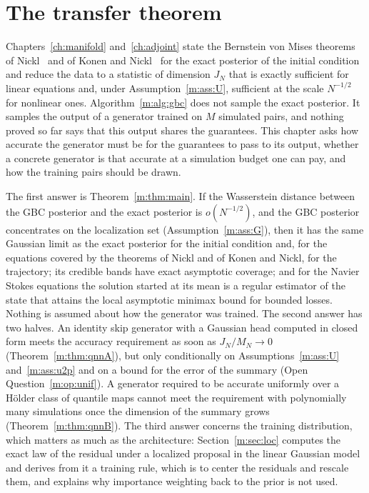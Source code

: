 \section{The transfer theorem}\label{m:sec:main}

Chapters~\ref{ch:manifold} and~\ref{ch:adjoint} state the Bernstein von Mises theorems of Nickl~\cite{nicklbvm2024} and of Konen and Nickl~\cite{konennickl2026} for the exact posterior of the initial condition and reduce the data to a statistic of dimension $J_N$ that is exactly sufficient for linear equations and, under Assumption~\ref{m:ass:U}, sufficient at the scale $N^{-1/2}$ for nonlinear ones. Algorithm~\ref{m:alg:gbc} does not sample the exact posterior. It samples the output of a generator trained on $M$ simulated pairs, and nothing proved so far says that this output shares the guarantees. This chapter asks how accurate the generator must be for the guarantees to pass to its output, whether a concrete generator is that accurate at a simulation budget one can pay, and how the training pairs should be drawn.

The first answer is Theorem~\ref{m:thm:main}. If the Wasserstein distance between the GBC posterior and the exact posterior is $o(N^{-1/2})$, and the GBC posterior concentrates on the localization set (Assumption~\ref{m:ass:G}), then it has the same Gaussian limit as the exact posterior for the initial condition and, for the equations covered by the theorems of Nickl and of Konen and Nickl, for the trajectory; its credible bands have exact asymptotic coverage; and for the Navier Stokes equations the solution started at its mean is a regular estimator of the state that attains the local asymptotic minimax bound for bounded losses. Nothing is assumed about how the generator was trained. The second answer has two halves. An identity skip generator with a Gaussian head computed in closed form meets the accuracy requirement as soon as $J_N/M_N\to0$ (Theorem~\ref{m:thm:qnnA}), but only conditionally on Assumptions~\ref{m:ass:U} and~\ref{m:ass:u2p} and on a bound for the error of the summary (Open Question~\ref{m:op:unif}). A generator required to be accurate uniformly over a H\"older class of quantile maps cannot meet the requirement with polynomially many simulations once the dimension of the summary grows (Theorem~\ref{m:thm:qnnB}). The third answer concerns the training distribution, which matters as much as the architecture: Section~\ref{m:sec:loc} computes the exact law of the residual under a localized proposal in the linear Gaussian model and derives from it a training rule, which is to center the residuals and rescale them, and explains why importance weighting back to the prior is not used.

